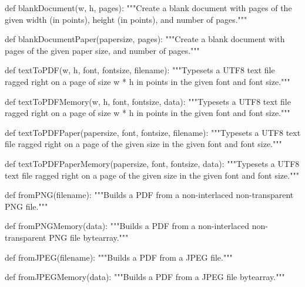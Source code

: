 def blankDocument(w, h, pages):
    """Create a blank document with pages of the given width (in points),
    height (in points), and number of pages."""

def blankDocumentPaper(papersize, pages):
    """Create a blank document with pages of the given paper size, and number
    of pages."""

def textToPDF(w, h, font, fontsize, filename):
    """Typesets a UTF8 text file ragged right on a page of size w * h in points
    in the given font and font size."""

def textToPDFMemory(w, h, font, fontsize, data):
    """Typesets a UTF8 text file ragged right on a page of size w * h in points
    in the given font and font size."""

def textToPDFPaper(papersize, font, fontsize, filename):
    """Typesets a UTF8 text file ragged right on a page of the given size in
    the given font and font size."""

def textToPDFPaperMemory(papersize, font, fontsize, data):
    """Typesets a UTF8 text file ragged right on a page of the given size in
    the given font and font size."""

def fromPNG(filename):
    """Builds a PDF from a non-interlaced non-transparent PNG file."""

def fromPNGMemory(data):
    """Builds a PDF from a non-interlaced non-transparent PNG file bytearray."""

def fromJPEG(filename):
    """Builds a PDF from a JPEG file."""

def fromJPEGMemory(data):
    """Builds a PDF from a JPEG file bytearray."""
